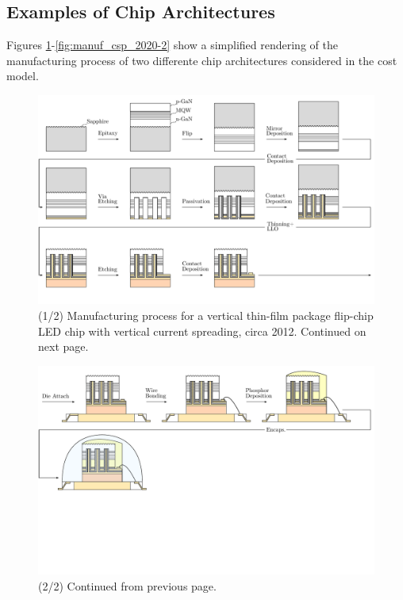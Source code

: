 \documentclass[10pt]{article}
\begin{document}
\subsection{Examples of Chip Architectures}

Figures \ref{fig:manuf_vtf_2012-1}-\ref{fig:manuf_csp_2020-2} show a simplified rendering of the manufacturing process of two differente chip architectures considered in the cost model.


    \begin{landscape}
        \begin{figure}
            \includegraphics[width=595pt]{./figures/vtf_overview_2012-1.pdf}
            \caption{(1/2) Manufacturing process for a vertical thin-film  package flip-chip LED chip with vertical current spreading, circa 2012. Continued on next page.}
            \label{fig:manuf_vtf_2012-1}
        \end{figure}
    \end{landscape}

    \begin{landscape}
        \begin{figure}
            \includegraphics[width=595pt]{./figures/vtf_overview_2012-2.pdf}
            \caption{(2/2) Continued from previous page.}
            \label{fig:manuf_vtf_2012-2}
        \end{figure}
    \end{landscape}
\end{document}
